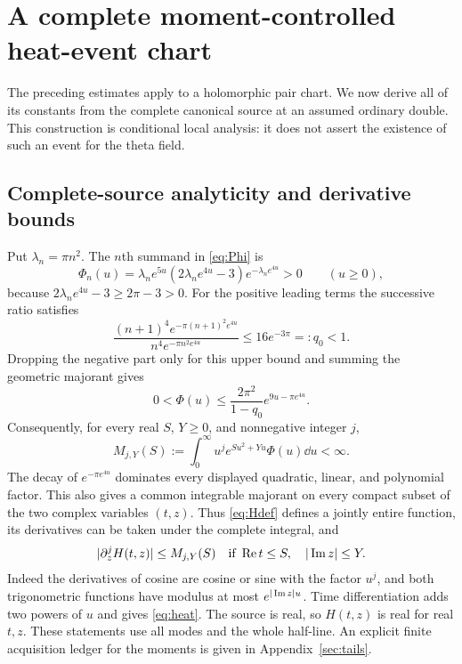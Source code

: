 \section{A complete moment-controlled heat-event chart}\label{sec:heat}

The preceding estimates apply to a holomorphic pair chart. We now derive
all of its constants from the complete canonical source at an assumed
ordinary double. This construction is conditional local analysis: it
does not assert the existence of such an event for the theta field.

\subsection{Complete-source analyticity and derivative bounds}
Put $\lambda_n=\pi n^2$. The $n$th summand in \eqref{eq:Phi} is
\[
 \Phi_n(u)=\lambda_n e^{5u}(2\lambda_n e^{4u}-3)
                        e^{-\lambda_n e^{4u}}>0
 \qquad(u\geq0),
\]
because $2\lambda_n e^{4u}-3\geq2\pi-3>0$.
For the positive leading terms the successive ratio satisfies
\[
 \frac{(n+1)^4e^{-\pi(n+1)^2e^{4u}}}
      {n^4e^{-\pi n^2e^{4u}}}
 \leq16e^{-3\pi}=:q_0<1.
\]
Dropping the negative part only for this upper bound and summing the
geometric majorant gives
\begin{equation}\label{eq:sourceglobal}
 0<\Phi(u)\leq\frac{2\pi^2}{1-q_0}
                          e^{9u-\pi e^{4u}}.
\end{equation}
Consequently, for every real $S$, $Y\geq0$, and nonnegative integer $j$,
\begin{equation}\label{eq:generalmoment}
 M_{j,Y}(S):=\int_0^\infty u^j e^{Su^2+Yu}\Phi(u)\dd u
                                                        <\infty.
\end{equation}
The decay of $e^{-\pi e^{4u}}$ dominates every displayed quadratic,
linear, and polynomial factor. This also gives a common integrable
majorant on every compact subset of the two complex variables $(t,z)$.
Thus \eqref{eq:Hdef} defines a jointly entire function, its derivatives
can be taken under the complete integral, and
\begin{equation}\label{eq:momentderivative}
 |\partial_z^jH(t,z)|\leq M_{j,Y}(S)
 \quad\text{if }\operatorname{Re} t\leq S,\quad |\operatorname{Im} z|\leq Y.
\end{equation}
Indeed the derivatives of cosine are cosine or sine with the factor
$u^j$, and both trigonometric functions have modulus at most
$e^{|\operatorname{Im} z|u}$. Time differentiation adds two powers of $u$ and
gives \eqref{eq:heat}. The source is real, so $H(t,z)$ is real for
real $t,z$. These statements use all modes and the whole half-line.
An explicit finite acquisition ledger for the moments is given in
Appendix~\ref{sec:tails}.

